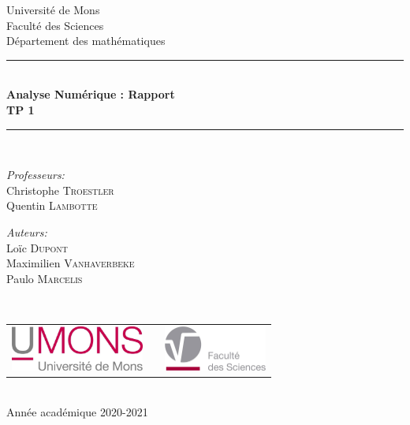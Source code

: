 \documentclass[a4paper, 12pt]{article}
\begin{document}
\begin{titlepage}
\begin{center}

{\Large Université de Mons}\\[1ex]
{\Large Faculté des Sciences}\\[1ex]
{\Large Département des mathématiques}\\[2.5cm]

\newcommand{\HRule}{\rule{\linewidth}{0.3mm}}
\HRule \\[0.3cm]
{ \LARGE \bfseries Analyse Numérique : Rapport \\[0.3cm]}
{ \LARGE \bfseries TP 1 \\[0.1cm]}
\HRule \\[1.5cm]

\begin{minipage}[t]{0.45\textwidth}
\begin{flushleft} \large
\emph{Professeurs:}\\
Christophe \textsc{Troestler} \\
Quentin \textsc{Lambotte}
\end{flushleft}
\end{minipage}
\begin{minipage}[t]{0.45\textwidth}
\begin{flushright} \large
\emph{Auteurs:} \\
Loïc \textsc{Dupont} \\
Maximilien \textsc{Vanhaverbeke} \\
Paulo \textsc{Marcelis}
\end{flushright}
\end{minipage}\\[2ex]

\vfill

\begin{center}
\begin{tabular}[t]{c c c}
\includegraphics[height=1.5cm]{logoumons.jpg} &
\hspace{0.3cm} &
\includegraphics[height=1.5cm]{logofs.jpg}
\end{tabular}
\end{center}~\\
 
{\large Année académique 2020-2021}

\end{center}
\end{titlepage}
\end{document}
